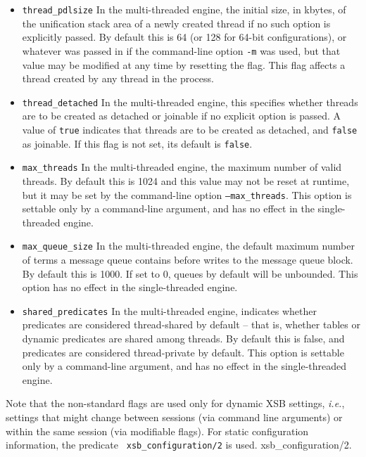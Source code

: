 \begin{description}
\begin{itemize}
\item {\tt thread\_pdlsize} In the multi-threaded engine, the initial
  size, in kbytes, of the unification stack area of a newly created
  thread if no such option is explicitly passed.  By default this is
  64 (or 128 for 64-bit configurations), or whatever was passed in if
  the command-line option {\tt -m} was used, but that value may be
  modified at any time by resetting the flag.  This flag affects a
  thread created by any thread in the process.

\item {\tt thread\_detached} In the multi-threaded engine, this
  specifies whether threads are to be created as detached or joinable
  if no explicit option is passed.  A value of {\tt true} indicates
  that threads are to be created as detached, and {\tt false} as
  joinable.  If this flag is not set, its default is {\tt false}.

\item {\tt max\_threads} In the multi-threaded engine, the maximum
  number of valid threads.  By default this is 1024 and this value may
  not be reset at runtime, but it may be set by the command-line
  option {\tt --max\_threads}.  This option is settable only by a
  command-line argument, and has no effect in the single-threaded
  engine.

\item {\tt max\_queue\_size} In the multi-threaded engine, the default
  maximum number of terms a message queue contains before writes to
  the message queue block.  By default this is 1000.  If set to 0,
  queues by default will be unbounded.  This option has no effect in
  the single-threaded engine.

\item {\tt shared\_predicates} In the multi-threaded engine, indicates
  whether predicates are considered thread-shared by default -- that
  is, whether tables or dynamic predicates are shared among threads.
  By default this is false, and predicates are considered
  thread-private by default.  This option is settable only by a
  command-line argument, and has no effect in the
  single-threaded engine.

\end{itemize}
    
Note that the non-standard flags are used only for dynamic XSB
settings, {\it i.e.}, settings that might change between sessions (via
command line arguments) or within the same session (via modifiable
flags).  For static configuration information, the predicate {\tt
  xsb\_configuration/2} is used. {xsb\_configuration/2}.


\end{description}
